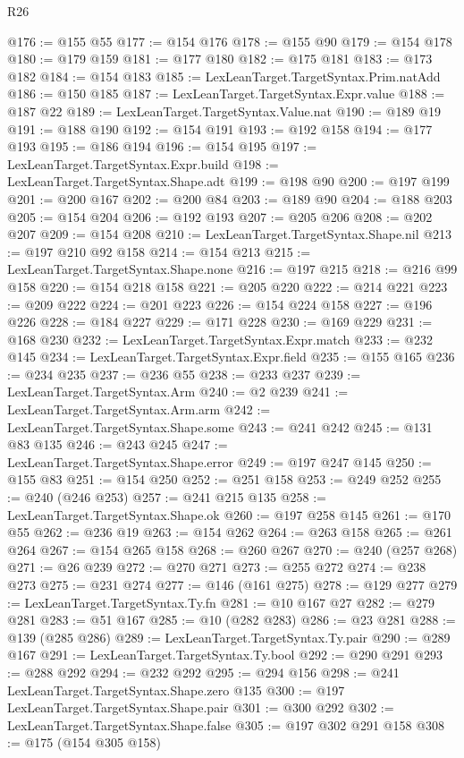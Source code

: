 \begin{lexlean}{R26}
\begin{coremodule}
@176 := @155 @55
@177 := @154 @176
@178 := @155 @90
@179 := @154 @178
@180 := @179 @159
@181 := @177 @180
@182 := @175 @181
@183 := @173 @182
@184 := @154 @183
@185 := LexLeanTarget.TargetSyntax.Prim.natAdd
@186 := @150 @185
@187 := LexLeanTarget.TargetSyntax.Expr.value
@188 := @187 @22
@189 := LexLeanTarget.TargetSyntax.Value.nat
@190 := @189 @19
@191 := @188 @190
@192 := @154 @191
@193 := @192 @158
@194 := @177 @193
@195 := @186 @194
@196 := @154 @195
@197 := LexLeanTarget.TargetSyntax.Expr.build
@198 := LexLeanTarget.TargetSyntax.Shape.adt
@199 := @198 @90
@200 := @197 @199
@201 := @200 @167
@202 := @200 @84
@203 := @189 @90
@204 := @188 @203
@205 := @154 @204
@206 := @192 @193
@207 := @205 @206
@208 := @202 @207
@209 := @154 @208
@210 := LexLeanTarget.TargetSyntax.Shape.nil
@213 := @197 @210 @92 @158
@214 := @154 @213
@215 := LexLeanTarget.TargetSyntax.Shape.none
@216 := @197 @215
@218 := @216 @99 @158
@220 := @154 @218 @158
@221 := @205 @220
@222 := @214 @221
@223 := @209 @222
@224 := @201 @223
@226 := @154 @224 @158
@227 := @196 @226
@228 := @184 @227
@229 := @171 @228
@230 := @169 @229
@231 := @168 @230
@232 := LexLeanTarget.TargetSyntax.Expr.match
@233 := @232 @145
@234 := LexLeanTarget.TargetSyntax.Expr.field
@235 := @155 @165
@236 := @234 @235
@237 := @236 @55
@238 := @233 @237
@239 := LexLeanTarget.TargetSyntax.Arm
@240 := @2 @239
@241 := LexLeanTarget.TargetSyntax.Arm.arm
@242 := LexLeanTarget.TargetSyntax.Shape.some
@243 := @241 @242
@245 := @131 @83 @135
@246 := @243 @245
@247 := LexLeanTarget.TargetSyntax.Shape.error
@249 := @197 @247 @145
@250 := @155 @83
@251 := @154 @250
@252 := @251 @158
@253 := @249 @252
@255 := @240 (@246 @253)
@257 := @241 @215 @135
@258 := LexLeanTarget.TargetSyntax.Shape.ok
@260 := @197 @258 @145
@261 := @170 @55
@262 := @236 @19
@263 := @154 @262
@264 := @263 @158
@265 := @261 @264
@267 := @154 @265 @158
@268 := @260 @267
@270 := @240 (@257 @268)
@271 := @26 @239
@272 := @270 @271
@273 := @255 @272
@274 := @238 @273
@275 := @231 @274
@277 := @146 (@161 @275)
@278 := @129 @277
@279 := LexLeanTarget.TargetSyntax.Ty.fn
@281 := @10 @167 @27
@282 := @279 @281
@283 := @51 @167
@285 := @10 (@282 @283)
@286 := @23 @281
@288 := @139 (@285 @286)
@289 := LexLeanTarget.TargetSyntax.Ty.pair
@290 := @289 @167
@291 := LexLeanTarget.TargetSyntax.Ty.bool
@292 := @290 @291
@293 := @288 @292
@294 := @232 @292
@295 := @294 @156
@298 := @241 LexLeanTarget.TargetSyntax.Shape.zero @135
@300 := @197 LexLeanTarget.TargetSyntax.Shape.pair
@301 := @300 @292
@302 := LexLeanTarget.TargetSyntax.Shape.false
@305 := @197 @302 @291 @158
@308 := @175 (@154 @305 @158)

\end{coremodule}
\end{lexlean}
